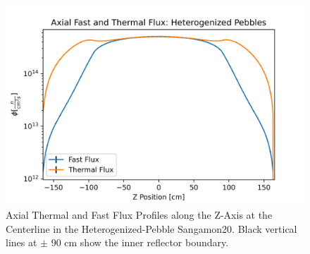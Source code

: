 \begin{figure}[H]
\centering

  \includegraphics[width=0.95\linewidth]{figures/fast_therm_flux_het_z_er.png}

\caption{Axial Thermal and Fast Flux Profiles along the Z-Axis at the Centerline in the Heterogenized-Pebble Sangamon20.  Black vertical lines at $\pm$ 90 cm show the inner reflector boundary.}
\label{fig:het-det-z}
\end{figure}